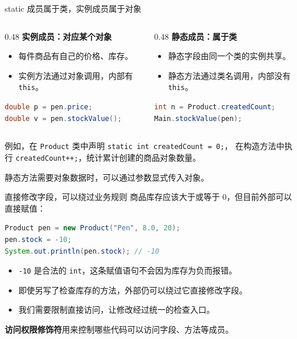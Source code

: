 \documentclass[aspectratio=169]{beamer}
\begin{document}
\begin{frame}[fragile]{static 成员属于类，实例成员属于对象}
  \begin{columns}[T,onlytextwidth]
    \begin{column}{0.48\textwidth}
      \textbf{实例成员：对应某个对象}
      \begin{itemize}
        \item 每件商品有自己的价格、库存。
        \item 实例方法通过对象调用，内部有 \texttt{this}。
      \end{itemize}
      \begin{lstlisting}[language=Java]
double p = pen.price;
double v = pen.stockValue();
      \end{lstlisting}
    \end{column}
    \begin{column}{0.48\textwidth}
      \textbf{静态成员：属于类}
      \begin{itemize}
        \item 静态字段由同一个类的实例共享。
        \item 静态方法通过类名调用，内部没有 \texttt{this}。
      \end{itemize}
      \begin{lstlisting}[language=Java]
int n = Product.createdCount;
Main.stockValue(pen);
      \end{lstlisting}
    \end{column}
  \end{columns}
  \medskip
  例如，在 \texttt{Product} 类中声明 \texttt{static int createdCount = 0;}，
  在构造方法中执行 \texttt{createdCount++;}，统计累计创建的商品对象数量。
  \par\medskip
  静态方法需要对象数据时，可以\alert{通过参数显式传入对象}。
\end{frame}

\begin{frame}[fragile]{直接修改字段，可以绕过业务规则}
  商品库存应该大于或等于 0，但目前外部可以直接赋值：
  \begin{lstlisting}[language=Java]
Product pen = new Product("Pen", 8.0, 20);
pen.stock = -10;
System.out.println(pen.stock); // -10
  \end{lstlisting}
  \begin{itemize}
    \item \texttt{-10} 是合法的 \texttt{int}，这条赋值语句不会因为库存为负而报错。
    \item 即使另写了检查库存的方法，外部仍可以绕过它直接修改字段。
    \item 我们需要限制直接访问，让修改经过\alert{统一的检查入口}。
  \end{itemize}
  \medskip
  \textbf{访问权限修饰符}用来控制哪些代码可以访问字段、方法等成员。
\end{frame}
\end{document}
